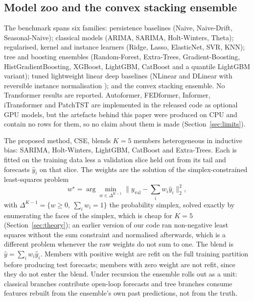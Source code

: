 \documentclass[journal]{IEEEtran}
\begin{document}
\subsection{Model zoo and the convex stacking ensemble}
\label{sec:zoo}
The benchmark spans six families: persistence baselines (Naive, Naive-Drift, Seasonal-Naive); classical models (ARIMA, SARIMA, Holt-Winters, Theta); regularised, kernel and instance learners (Ridge, Lasso, ElasticNet, SVR, KNN); tree and boosting ensembles (Random-Forest, Extra-Trees, Gradient-Boosting, HistGradientBoosting, XGBoost, LightGBM, CatBoost and a quantile LightGBM variant); tuned lightweight linear deep baselines (NLinear and DLinear with reversible instance normalisation \cite{r30}); and the convex stacking ensemble. No Transformer results are reported. Autoformer, FEDformer, Informer, iTransformer and PatchTST are implemented in the released code as optional GPU models, but the artefacts behind this paper were produced on CPU and contain no rows for them, so no claim about them is made (Section~\ref{sec:limits}).

The proposed method, CSE, blends $K = 5$ members heterogeneous in inductive bias: SARIMA, Holt-Winters, LightGBM, CatBoost and Extra-Trees. Each is fitted on the training data less a validation slice held out from its tail and forecasts $\hat{y}_i$ on that slice. The weights are the solution of the simplex-constrained least-squares problem
\begin{equation}
w^{\star} = \arg\min_{w \in \Delta^{K-1}} \Bigg\| y_{\mathrm{val}} - \sum_{i} w_i \hat{y}_i \Bigg\|_2^2,
\label{eq:nnls}
\end{equation}
with $\Delta^{K-1} = \{ w \geq 0,\ \sum_i w_i = 1 \}$ the probability simplex, solved exactly by enumerating the faces of the simplex, which is cheap for $K = 5$ (Section~\ref{sec:theory}); an earlier version of our code ran non-negative least squares without the sum constraint and normalised afterwards, which is a different problem whenever the raw weights do not sum to one. The blend is $\hat{y} = \sum_i w_i \hat{y}_i$. Members with positive weight are refit on the full training partition before producing test forecasts; members with zero weight are not refit, since they do not enter the blend. Under recursion the ensemble rolls out as a unit: classical branches contribute open-loop forecasts and tree branches consume features rebuilt from the ensemble's own past predictions, not from the truth.
\end{document}
